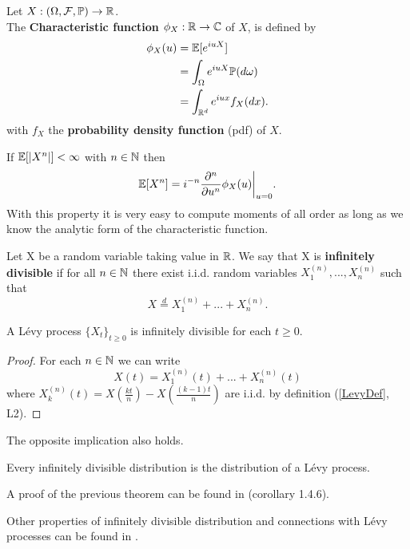 \begin{Definition} \label{chf}
Let $X:(\Omega,\mathcal{F}, \mathbb{P}) \to \mathbb{R}$.\\ 
The \textbf{Characteristic function} $\phi_X:\mathbb{R} \to \mathbb{C}$  of $X$, is defined by
\begin{align}
\phi_{X}(u) &= \mathbb{E} [e^{iuX}] \nonumber \\
            &= \int_{\Omega} e^{iuX} \mathbb{P}(d\omega) \nonumber \\
            &= \int_{\mathbb{R}^d} e^{iux} f_X(dx).
\end{align}
with $f_X$ the \textbf{probability density function} (pdf) of $X$.
\end{Definition}
If $\mathbb{E}[|X^{n}|] < \infty$ with $n \in \mathbb{N}$ then
\begin{equation}\label{moments}
 \mathbb{E}[X^{n}] = i^{-n}\frac{\partial^n}{\partial u^{n}} \phi_X(u) \biggr|_{u=0} .
\end{equation}
With this property it is very easy to compute moments of all order as long as we know the analytic form 
of the characteristic function.
\begin{Definition}\label{inf_div}
 Let X be a random variable taking value in $\mathbb{R}$.
 We say that X is \textbf{infinitely divisible} if for all $n \in \mathbb{N}$ there exist i.i.d. random variables $X_1^{(n)},...,X_n^{(n)}$
 such that
 \begin{equation}
  X \overset{d}{=} X_1^{(n)} + ... + X_n^{(n)}.
 \end{equation}
\end{Definition}

\begin{Theorem}
 A Lévy process $\{X_t\}_{t \ge 0}$ is infinitely divisible for each $t\geq0$. 
\end{Theorem}
\begin{proof}
 For each $n \in \mathbb{N}$ we can write 
 $$ X(t) = X_1^{(n)}(t) + ... + X_n^{(n)}(t) $$
 where $ X_k^{(n)}(t) = X(\frac{kt}{n}) - X(\frac{(k-1)t}{n}) $ are i.i.d. by definition (\ref{LevyDef}, L2).
\end{proof}

The opposite implication also holds. 
\begin{Theorem}
Every infinitely divisible distribution is the distribution of a Lévy process. 
\end{Theorem}
A proof of the previous theorem can be found in \cite{Applebaum} (corollary 1.4.6).

Other properties of infinitely divisible distribution and connections with Lévy processes can be found in \cite{Sato}.\\

